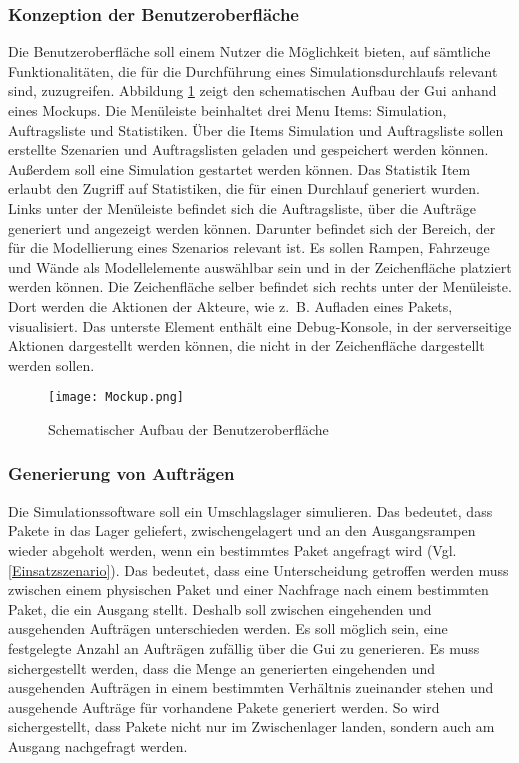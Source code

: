 \subsubsection{Konzeption der Benutzeroberfläche}
Die Benutzeroberfläche soll einem Nutzer die Möglichkeit bieten, auf sämtliche Funktionalitäten, die für die Durchführung eines Simulationsdurchlaufs relevant sind, zuzugreifen. Abbildung \ref{GUI} zeigt den schematischen Aufbau der Gui anhand eines Mockups. Die Menüleiste beinhaltet drei Menu Items: Simulation, Auftragsliste und Statistiken. Über die Items Simulation und Auftragsliste sollen erstellte Szenarien und Auftragslisten geladen und gespeichert werden können. Außerdem soll eine Simulation gestartet werden können. Das Statistik Item erlaubt den Zugriff auf Statistiken, die für einen Durchlauf generiert wurden. Links unter der Menüleiste befindet sich die Auftragsliste, über die Aufträge generiert und angezeigt werden können. Darunter befindet sich der Bereich, der für die Modellierung eines Szenarios relevant ist. Es sollen Rampen, Fahrzeuge und Wände als Modellelemente auswählbar sein und in der Zeichenfläche platziert werden können. Die Zeichenfläche selber befindet sich rechts unter der Menüleiste. Dort werden die Aktionen der Akteure, wie z.~B. Aufladen eines Pakets, visualisiert. Das unterste Element enthält eine Debug-Konsole, in der serverseitige Aktionen dargestellt werden können, die nicht in der Zeichenfläche dargestellt werden sollen. 
\begin{figure}[h!]
	\centering
		\texttt{[image: Mockup.png]}        
		\caption{Schematischer Aufbau der Benutzeroberfläche}
	\label{GUI}
\end{figure}
\subsubsection{Generierung von Aufträgen} \label{Generierung von Aufträgen}  
Die Simulationssoftware soll ein Umschlagslager simulieren. Das bedeutet, dass Pakete in das Lager geliefert, zwischengelagert und an den Ausgangsrampen wieder abgeholt werden, wenn ein bestimmtes Paket angefragt wird (Vgl.\ref{Einsatzszenario}). Das bedeutet, dass eine Unterscheidung getroffen werden muss zwischen einem physischen Paket und einer Nachfrage nach einem bestimmten Paket, die ein Ausgang stellt. Deshalb soll zwischen eingehenden und ausgehenden Aufträgen unterschieden werden. Es soll möglich sein, eine festgelegte Anzahl an Aufträgen zufällig über die Gui zu generieren. Es muss sichergestellt werden, dass die Menge an generierten eingehenden und ausgehenden Aufträgen in einem bestimmten Verhältnis zueinander stehen und ausgehende Aufträge für vorhandene Pakete generiert werden. So wird sichergestellt, dass Pakete nicht nur im Zwischenlager landen, sondern auch am Ausgang nachgefragt werden.
